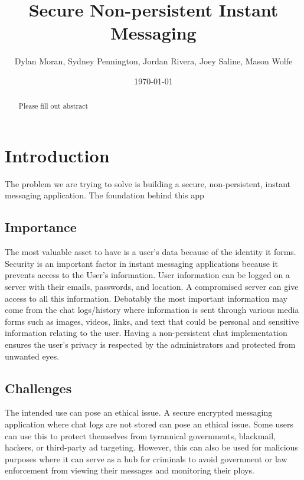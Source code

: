 \documentclass[11pt]{article}
\date{
\today
}
\theoremstyle{plain}
\theoremstyle{definition}
\begin{document}
\title{Secure Non-persistent Instant Messaging}
\author{Dylan Moran, Sydney Pennington, Jordan Rivera, Joey Saline, Mason Wolfe}
\maketitle
	
\begin{abstract}
Please fill out abstract
		
\end{abstract}


\section{Introduction}\label{sec:intro}
The problem we are trying to solve is building a secure, non-persistent, instant messaging application. The foundation behind this app

\subsection{Importance}\label{sec:importance}
The most valuable asset to have is a user’s data because of the identity it forms. Security is an important factor in instant messaging applications because it prevents access to the User’s information. User information can be logged on a server with their emails, passwords, and location. A compromised server can give access to all this information. Debatably the most important information may come from the chat logs/history where information is sent through various media forms such as images, videos, links, and text that could be personal and sensitive information relating to the user. Having a non-persistent chat implementation ensures the user’s privacy is respected by the administrators and protected from unwanted eyes.

\subsection{Challenges}\label{sec:challenges}
The intended use can pose an ethical issue. A secure encrypted messaging application where chat logs are not stored can pose an ethical issue. Some users can use this to protect themselves from tyrannical governments, blackmail, hackers, or third-party ad targeting. However, this can also be used for malicious purposes where it can serve as a hub for criminals to avoid government or law enforcement from viewing their messages and monitoring their ploys.
\end{document}
